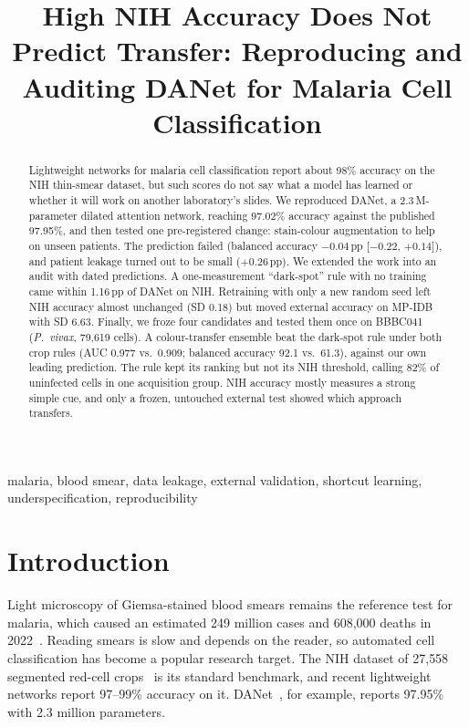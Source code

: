 \documentclass[conference]{IEEEtran}
\newcommand{\pp}{\,pp}
\begin{document}
\title{High NIH Accuracy Does Not Predict Transfer: Reproducing and Auditing DANet for Malaria Cell Classification}

\author{
}

\maketitle

\begin{abstract}
Lightweight networks for malaria cell classification report about 98\% accuracy on the NIH thin-smear dataset, but such scores do not say what a model has learned or whether it will work on another laboratory's slides. We reproduced DANet, a 2.3\,M-parameter dilated attention network, reaching 97.02\% accuracy against the published 97.95\%, and then tested one pre-registered change: stain-colour augmentation to help on unseen patients. The prediction failed (balanced accuracy $-0.04$\pp{} [$-0.22$, $+0.14$]), and patient leakage turned out to be small ($+0.26$\pp). We extended the work into an audit with dated predictions. A one-measurement ``dark-spot'' rule with no training came within 1.16\pp{} of DANet on NIH. Retraining with only a new random seed left NIH accuracy almost unchanged (SD 0.18) but moved external accuracy on MP-IDB with SD 6.63. Finally, we froze four candidates and tested them once on BBBC041 (\textit{P.~vivax}, 79{,}619 cells). A colour-transfer ensemble beat the dark-spot rule under both crop rules (AUC 0.977 vs.\ 0.909; balanced accuracy 92.1 vs.\ 61.3), against our own leading prediction. The rule kept its ranking but not its NIH threshold, calling 82\% of uninfected cells in one acquisition group. NIH accuracy mostly measures a strong simple cue, and only a frozen, untouched external test showed which approach transfers.
\end{abstract}

\begin{IEEEkeywords}
malaria, blood smear, data leakage, external validation, shortcut learning, underspecification, reproducibility
\end{IEEEkeywords}

\section{Introduction}
Light microscopy of Giemsa-stained blood smears remains the reference test for malaria, which caused an estimated 249 million cases and 608{,}000 deaths in 2022~\cite{who2023}. Reading smears is slow and depends on the reader, so automated cell classification has become a popular research target. The NIH dataset of 27{,}558 segmented red-cell crops~\cite{rajaraman2018} is its standard benchmark, and recent lightweight networks report 97--99\% accuracy on it. DANet~\cite{ali2025danet}, for example, reports 97.95\% with 2.3 million parameters.
\end{document}
